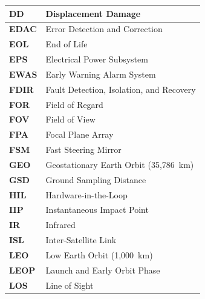{\begin{longtable}{|>{\raggedright\arraybackslash}p{3.2cm}|>{\raggedright\arraybackslash}p{12.1cm}|}
    \textbf{DD}                       & Displacement Damage                               \\ \hline
    \textbf{EDAC}                     & Error Detection and Correction                    \\ \hline
    \textbf{EOL}                      & End of Life                                       \\ \hline
    \textbf{EPS}                      & Electrical Power Subsystem                        \\ \hline
    \textbf{EWAS}                     & Early Warning Alarm System                        \\ \hline
    \textbf{FDIR}                     & Fault Detection, Isolation, and Recovery          \\ \hline
    \textbf{FOR}                      & Field of Regard                                   \\ \hline
    \textbf{FOV}                      & Field of View                                     \\ \hline
    \textbf{FPA}                      & Focal Plane Array                                 \\ \hline
    \textbf{FSM}                      & Fast Steering Mirror                              \\ \hline
    \textbf{GEO}                      & Geostationary Earth Orbit (35,786~km)             \\ \hline
    \textbf{GSD}                      & Ground Sampling Distance                          \\ \hline
    \textbf{HIL}                      & Hardware-in-the-Loop                              \\ \hline
    \textbf{IIP}                      & Instantaneous Impact Point                        \\ \hline
    \textbf{IR}                       & Infrared                                          \\ \hline
    \textbf{ISL}                      & Inter-Satellite Link                              \\ \hline
    \textbf{LEO}                      & Low Earth Orbit (1,000~km)                        \\ \hline
    \textbf{LEOP}                     & Launch and Early Orbit Phase                      \\ \hline
    \textbf{LOS}                      & Line of Sight                                     \\ \hline

\end{longtable}}
